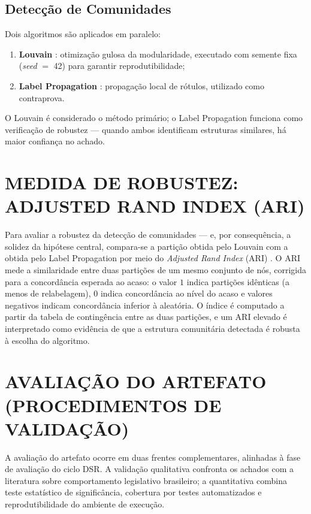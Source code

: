 \documentclass[
      12pt,
      a4paper,
      openright,
      oneside,
      chapter=TITLE,
      section=TITLE,
      english,
      french,
      spanish,
      brazilian
    ]{abntex2}
\begin{document}
    \subsection{Detecção de Comunidades}
    
    Dois algoritmos são aplicados em paralelo:
    
    \begin{enumerate}[label=\alph*)]
        \item \textbf{Louvain} \cite{blondel2008}: otimização gulosa da modularidade, executado com semente fixa (\textit{seed} $=$ 42) para garantir reprodutibilidade;
        \item \textbf{Label Propagation} \cite{raghavan2007}: propagação local de rótulos, utilizado como contraprova.
    \end{enumerate}
    
    O Louvain é considerado o método primário; o Label Propagation funciona como verificação de robustez --- quando ambos identificam estruturas similares, há maior confiança no achado.
    
    \section{MEDIDA DE ROBUSTEZ: ADJUSTED RAND INDEX (ARI)}
    \label{sec:ari}
    
    Para avaliar a robustez da detecção de comunidades --- e, por consequência, a
    solidez da hipótese central, compara-se a partição obtida pelo Louvain com a
    obtida pelo Label Propagation por meio do \textit{Adjusted Rand Index} (ARI) \cite{hubert1985}. O
    ARI mede a similaridade entre duas partições de um mesmo conjunto de nós,
    corrigida para a concordância esperada ao acaso: o valor $1$ indica partições
    idênticas (a menos de relabelagem), $0$ indica concordância ao nível do acaso e
    valores negativos indicam concordância inferior à aleatória. O índice é computado
    a partir da tabela de contingência entre as duas partições, e um ARI elevado é
    interpretado como evidência de que a estrutura comunitária detectada é robusta à
    escolha do algoritmo.
    
    \section{AVALIAÇÃO DO ARTEFATO (PROCEDIMENTOS DE VALIDAÇÃO)}
    
    A avaliação do artefato ocorre em duas frentes complementares, alinhadas à fase
    de avaliação do ciclo DSR. A validação qualitativa confronta os achados com a
    literatura sobre comportamento legislativo brasileiro; a quantitativa combina
    teste estatístico de significância, cobertura por testes automatizados e
    reprodutibilidade do ambiente de execução.
    
\end{document}
